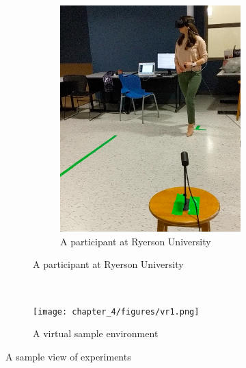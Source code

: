 \begin{figure}[!ht]
\begin{adjustbox}{varwidth=\textwidth,fbox,center}
\begin{subfigure}{0.8\linewidth}
\begin{subfigure}[b]{0.5\textwidth}
         \includegraphics[scale=0.4]{chapter_4/figures/img1.png}
         \caption{A participant at Ryerson University}
     \end{subfigure}
\end{subfigure}\\[2ex]
\begin{subfigure}{0.8\linewidth}

\centering
\texttt{[image: chapter\_4/figures/vr1.png]}
\caption{A virtual sample environment}
\end{subfigure}
\end{adjustbox}

\caption{A sample view of experiments}
\label{fig:vire}
\end{figure}

